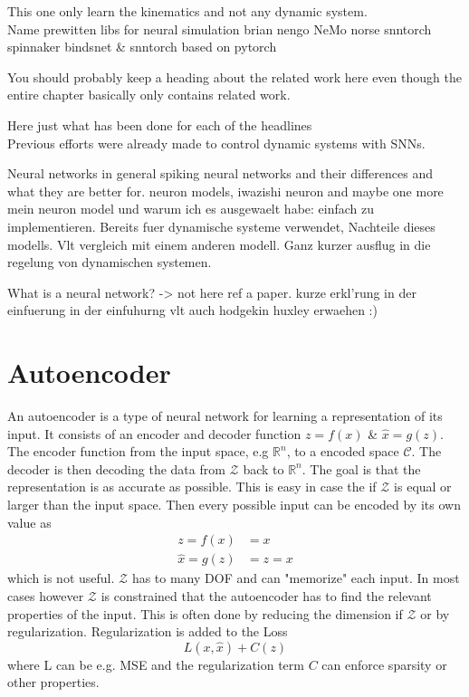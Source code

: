 This one only learn the kinematics and not any dynamic system.\\

Name prewitten libs for neural simulation
brian nengo NeMo norse snntorch spinnaker
bindsnet \& snntorch based on pytorch

You should probably keep a heading about the related work here even though the entire chapter basically only contains related work.

Here just what has been done for each of the headlines\\
Previous efforts were already made to control dynamic systems with \acp{SNN}.




Neural networks in general
spiking neural networks and their differences and what they are better for.
neuron models, iwazishi neuron and maybe one more
mein neuron model und warum ich es ausgewaelt habe: einfach zu implementieren. Bereits fuer dynamische systeme verwendet,
Nachteile dieses modells.
Vlt vergleich mit einem anderen modell.
Ganz kurzer ausflug in die regelung von dynamischen systemen.


What is a neural network? -> not here ref a paper. kurze erkl'rung in der einfuerung
in der einfuhurng vlt auch hodgekin huxley erwaehen :)




\section{Autoencoder}
An autoencoder is a type of neural network for learning a representation of its input. It consists of an encoder and decoder function $z =f(x)$ \& $\hat{x} = g(z)$. The encoder function from the input space, e.g $\mathbb{R}^n$, to a encoded space $\mathcal{C}$. The decoder is then decoding the data from $\mathcal{Z}$ back to $\mathbb{R}^n$. The goal is that the representation is as accurate as possible. This is easy in case the if $\mathcal{Z}$ is equal or larger than the input space. Then every possible input can be encoded by its own value as
\begin{equation}
\begin{aligned}
 	z = f(x) &= x\\
 	\hat{x} = g(z) &= z = x
\end{aligned}
\end{equation}
which is not useful. $\mathcal{Z}$ has to many DOF and can "memorize" each input. In most cases however $\mathcal{Z}$ is constrained that the autoencoder has to find the relevant properties of the input. This is often done by reducing the dimension if $\mathcal{Z}$ or by regularization. Regularization is added to the Loss
\begin{equation}
	L(x,\hat{x}) + C(z)
\end{equation}
where L can be e.g. MSE and the regularization term $C$ can enforce sparsity or other properties\cite{goodfellow_deep_2016}.





